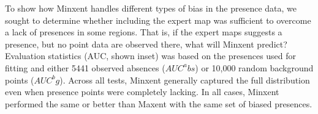 To show how Minxent handles different types of bias in the presence data, we sought to determine whether including the expert map was sufficient to overcome a lack of presences in some regions. That is, if the expert maps suggests a presence, but no point data are observed there, what will Minxent predict? Evaluation statistics (AUC, shown inset) was based on the presences used for fitting and either 5441 observed absences ($AUC^abs$) or 10,000 random background points ($AUC^bg$).  Across all tests, Minxent generally captured the full distribution even when presence points were completely lacking. In all cases, Minxent performed the same or better than Maxent with the same set of biased presences. 
